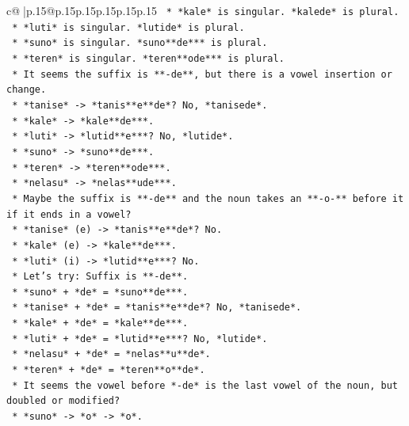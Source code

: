 \documentclass{article}
\begin{document}
{\begin{supertabular}{c@{$\;$}|p{.15\linewidth}@{}p{.15\linewidth}p{.15\linewidth}p{.15\linewidth}p{.15\linewidth}p{.15\linewidth}}
{{{\texttt{            *   *kale* is singular. *kalede* is plural.} \\
\texttt{            *   *luti* is singular. *lutide* is plural.} \\
\texttt{            *   *suno* is singular. *suno**de*** is plural.} \\
\texttt{            *   *teren* is singular. *teren**ode*** is plural.} \\
\texttt{            *   It seems the suffix is **{-}de**, but there is a vowel insertion or change.} \\
\texttt{            *   *tanise* {-}> *tanis**e**de*? No, *tanisede*.} \\
\texttt{            *   *kale* {-}> *kale**de***.} \\
\texttt{            *   *luti* {-}> *lutid**e***? No, *lutide*.} \\
\texttt{            *   *suno* {-}> *suno**de***.} \\
\texttt{            *   *teren* {-}> *teren**ode***.} \\
\texttt{            *   *nelasu* {-}> *nelas**ude***.} \\
\texttt{            *   Maybe the suffix is **{-}de** and the noun takes an **{-}o{-}** before it if it ends in a vowel?} \\
\texttt{                *   *tanise* (e) {-}> *tanis**e**de*? No.} \\
\texttt{                *   *kale* (e) {-}> *kale**de***.} \\
\texttt{                *   *luti* (i) {-}> *lutid**e***? No.} \\
\texttt{            *   Let's try: Suffix is **{-}de**.} \\
\texttt{                *   *suno* + *de* = *suno**de***.} \\
\texttt{                *   *tanise* + *de* = *tanis**e**de*? No, *tanisede*.} \\
\texttt{                *   *kale* + *de* = *kale**de***.} \\
\texttt{                *   *luti* + *de* = *lutid**e***? No, *lutide*.} \\
\texttt{                *   *nelasu* + *de* = *nelas**u**de*.} \\
\texttt{                *   *teren* + *de* = *teren**o**de*.} \\
\texttt{            *   It seems the vowel before *{-}de* is the last vowel of the noun, but doubled or modified?} \\
\texttt{                *   *suno* {-}> *o* {-}> *o*.} \\
}}}
\end{supertabular}}
\end{document}
